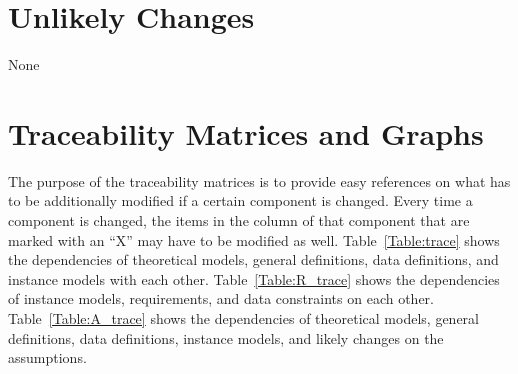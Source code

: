 \documentclass[12pt]{article}
\begin{document}
\section{Unlikely Changes}    

None
\section{Traceability Matrices and Graphs}

The purpose of the traceability matrices is to provide easy references on what
has to be additionally modified if a certain component is changed.  Every time a
component is changed, the items in the column of that component that are marked
with an ``X'' may have to be modified as well.  Table~\ref{Table:trace} shows the
dependencies of theoretical models, general definitions, data definitions, and
instance models with each other. Table~\ref{Table:R_trace} shows the
dependencies of instance models, requirements, and data constraints on each
other. Table~\ref{Table:A_trace} shows the dependencies of theoretical models,
general definitions, data definitions, instance models, and likely changes on
the assumptions.



\end{document}

